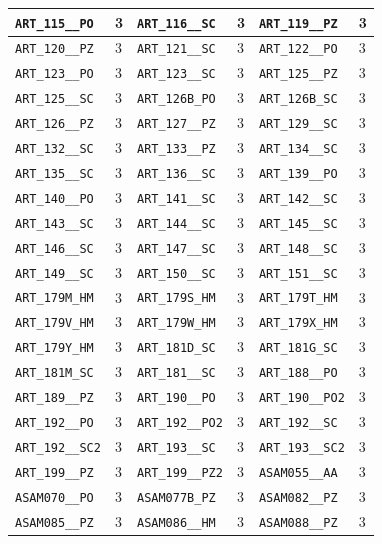 \begin{longtable}{|l|l||l|l||l|l|}
    \verb|ART_115__PO| & 3 & \verb|ART_116__SC| & 3 & \verb|ART_119__PZ| & 3\\\hline
    \verb|ART_120__PZ| & 3 & \verb|ART_121__SC| & 3 & \verb|ART_122__PO| & 3\\\hline
    \verb|ART_123__PO| & 3 & \verb|ART_123__SC| & 3 & \verb|ART_125__PZ| & 3\\\hline
    \verb|ART_125__SC| & 3 & \verb|ART_126B_PO| & 3 & \verb|ART_126B_SC| & 3\\\hline
    \verb|ART_126__PZ| & 3 & \verb|ART_127__PZ| & 3 & \verb|ART_129__SC| & 3\\\hline
    \verb|ART_132__SC| & 3 & \verb|ART_133__PZ| & 3 & \verb|ART_134__SC| & 3\\\hline
    \verb|ART_135__SC| & 3 & \verb|ART_136__SC| & 3 & \verb|ART_139__PO| & 3\\\hline
    \verb|ART_140__PO| & 3 & \verb|ART_141__SC| & 3 & \verb|ART_142__SC| & 3\\\hline
    \verb|ART_143__SC| & 3 & \verb|ART_144__SC| & 3 & \verb|ART_145__SC| & 3\\\hline
    \verb|ART_146__SC| & 3 & \verb|ART_147__SC| & 3 & \verb|ART_148__SC| & 3\\\hline
    \verb|ART_149__SC| & 3 & \verb|ART_150__SC| & 3 & \verb|ART_151__SC| & 3\\\hline
    \verb|ART_179M_HM| & 3 & \verb|ART_179S_HM| & 3 & \verb|ART_179T_HM| & 3\\\hline
    \verb|ART_179V_HM| & 3 & \verb|ART_179W_HM| & 3 & \verb|ART_179X_HM| & 3\\\hline
    \verb|ART_179Y_HM| & 3 & \verb|ART_181D_SC| & 3 & \verb|ART_181G_SC| & 3\\\hline
    \verb|ART_181M_SC| & 3 & \verb|ART_181__SC| & 3 & \verb|ART_188__PO| & 3\\\hline
    \verb|ART_189__PZ| & 3 & \verb|ART_190__PO| & 3 & \verb|ART_190__PO2| & 3\\\hline
    \verb|ART_192__PO| & 3 & \verb|ART_192__PO2| & 3 & \verb|ART_192__SC| & 3\\\hline
    \verb|ART_192__SC2| & 3 & \verb|ART_193__SC| & 3 & \verb|ART_193__SC2| & 3\\\hline
    \verb|ART_199__PZ| & 3 & \verb|ART_199__PZ2| & 3 & \verb|ASAM055__AA| & 3\\\hline
    \verb|ASAM070__PO| & 3 & \verb|ASAM077B_PZ| & 3 & \verb|ASAM082__PZ| & 3\\\hline
    \verb|ASAM085__PZ| & 3 & \verb|ASAM086__HM| & 3 & \verb|ASAM088__PZ| & 3\\\hline

\end{longtable}
